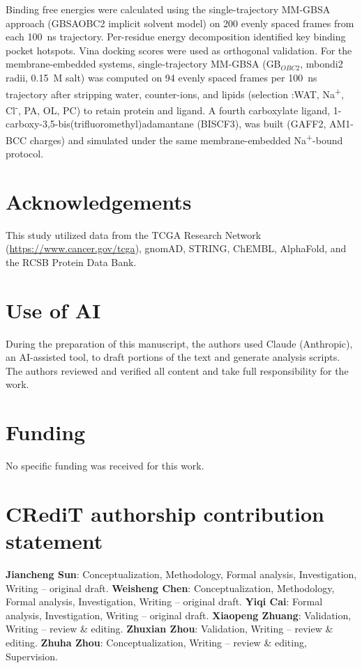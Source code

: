 \documentclass[10pt,letterpaper]{article}
\begin{document}
Binding free energies were calculated using the single-trajectory MM-GBSA approach (GBSAOBC2 implicit solvent model) on 200 evenly spaced frames from each 100~ns trajectory. Per-residue energy decomposition identified key binding pocket hotspots. Vina docking scores were used as orthogonal validation. For the membrane-embedded systems, single-trajectory MM-GBSA (GB$_{OBC2}$, mbondi2 radii, 0.15~M salt) was computed on 94 evenly spaced frames per 100~ns trajectory after stripping water, counter-ions, and lipids (selection :WAT, Na\textsuperscript{+}, Cl\textsuperscript{-}, PA, OL, PC) to retain protein and ligand. A fourth carboxylate ligand, 1-carboxy-3,5-bis(trifluoromethyl)adamantane (BISCF3), was built (GAFF2, AM1-BCC charges) and simulated under the same membrane-embedded Na\textsuperscript{+}-bound protocol.

\section*{Acknowledgements}
This study utilized data from the TCGA Research Network (\url{https://www.cancer.gov/tcga}), gnomAD, STRING, ChEMBL, AlphaFold, and the RCSB Protein Data Bank.

\section*{Use of AI}
During the preparation of this manuscript, the authors used Claude (Anthropic), an AI-assisted tool, to draft portions of the text and generate analysis scripts. The authors reviewed and verified all content and take full responsibility for the work.

\section*{Funding}
No specific funding was received for this work.

\section*{CRediT authorship contribution statement}
\textbf{Jiancheng Sun}: Conceptualization, Methodology, Formal analysis, Investigation, Writing -- original draft. \textbf{Weisheng Chen}: Conceptualization, Methodology, Formal analysis, Investigation, Writing -- original draft. \textbf{Yiqi Cai}: Formal analysis, Investigation, Writing -- original draft. \textbf{Xiaopeng Zhuang}: Validation, Writing -- review \& editing. \textbf{Zhuxian Zhou}: Validation, Writing -- review \& editing. \textbf{Zhuha Zhou}: Conceptualization, Writing -- review \& editing, Supervision.
\end{document}
